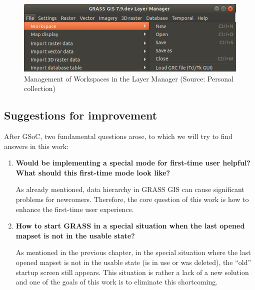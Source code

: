 \documentclass[a4paper,10pt,twoside]{article}
\begin{document}
\vspace{0.3cm}
\begin{figure}[hbt!] 
\begin{center}
\includegraphics[width=14cm]{../pictures/workspace_grass.png} 
\caption[Management of Workspaces in the Layer Manager]{Management of Workspaces in the Layer Manager (Source: Personal collection)}
\label{fig:workspace_grass}
\end{center}
\end{figure}


\newpage
\vspace*{-1cm}
\subsection{Suggestions for improvement}

After GSoC, two fundamental questions arose, to which we will try to find answers in this work:

\begin{enumerate}

\item  \noindent \textbf{Would be implementing a special mode for first-time user helpful? What should this first-time mode look like?}

\noindent As already mentioned, data hierarchy in GRASS GIS can cause significant problems for newcomers. Therefore, the core question of this work is how to enhance the first-time user experience.

\item \noindent \textbf{How to start GRASS in a special situation when the last opened mapset is not in the usable state?}

As mentioned in the previous chapter, in the special situation where the last opened mapset is not in the usable state (is in use or was deleted), the ``old'' startup screen still appears. This situation is rather a lack of a new solution and one of the goals of this work is to eliminate this shortcoming. 

\end{enumerate}
\end{document}

